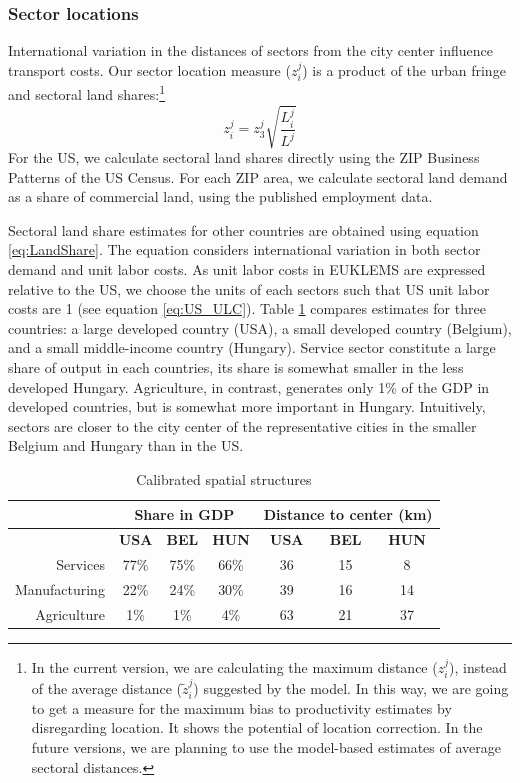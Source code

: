 \documentclass[12pt]{article}
\begin{document}
\subsubsection{Sector locations}

International variation in the distances of sectors from the city center influence transport costs. Our sector location measure ($z_i^j$) is a product of the urban fringe and sectoral land shares:\footnote{In the current version, we are calculating the maximum distance ($z_i^j$), instead of the average distance ($\tilde{z}_i^j$) suggested by the model. In this way, we are going to get a measure for the maximum bias to productivity estimates by disregarding location. It shows the potential of location correction. In the future versions, we are planning to use the model-based estimates of average sectoral distances.}
\begin{equation*}
z_i^j=z_3^j\sqrt{\frac{L_i^j}{L^j}}
\end{equation*}
For the US, we calculate sectoral land shares directly using the ZIP Business Patterns of the US Census. For each ZIP area, we calculate sectoral land demand as a share of commercial land, using the published employment data. %

Sectoral land share estimates for other countries are obtained using equation \ref{eq:LandShare}. The equation considers international variation in both sector demand and unit labor costs. As unit labor costs in EUKLEMS are expressed relative to the US, we choose the units of each sectors such that US unit labor costs are 1 (see equation \ref{eq:US_ULC}). Table \ref{tab:spatial_eg} compares estimates for three countries: a large developed country (USA), a small developed country (Belgium), and a small middle-income country (Hungary). Service sector constitute a large share of output in each countries, its share is somewhat smaller in the less developed Hungary. Agriculture, in contrast, generates only 1\% of the GDP in developed countries, but is somewhat more important in Hungary. Intuitively, sectors are closer to the city center of the representative cities in the smaller Belgium and Hungary than in the US.

\begin{table}[h!]
  \centering
  \caption{Calibrated spatial structures}
    \begin{tabular}{rcccccc}
    \toprule
    \textbf{} & \multicolumn{3}{c}{\textbf{Share in GDP}} & \multicolumn{3}{c}{\textbf{Distance to center (km)}} \\
    \midrule
    \textbf{} & \textbf{USA} & \textbf{BEL} & \textbf{HUN} & \textbf{USA} & \textbf{BEL} & \textbf{HUN} \\
    Services & 77\%  & 75\%  & 66\%  & 36    & 15    & 8 \\
    Manufacturing & 22\%  & 24\%  & 30\%  & 39    & 16    & 14 \\
    Agriculture & 1\%   & 1\%   & 4\%   & 63    & 21    & 37 \\
    \bottomrule
    \end{tabular}%
  \label{tab:spatial_eg}%
\end{table}%
\end{document}
